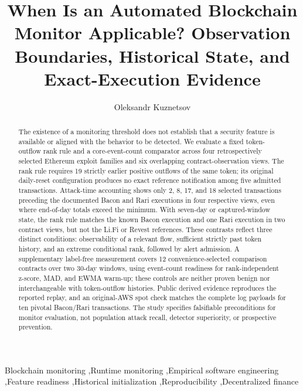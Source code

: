 \documentclass[preprint,12pt,authoryear]{elsarticle}
\begin{document}
\begin{frontmatter}
\title{When Is an Automated Blockchain Monitor Applicable? Observation Boundaries, Historical State, and Exact-Execution Evidence}
\author[aff1,aff2]{Oleksandr Kuznetsov}
\address[aff1]{Department of Theoretical and Applied Sciences, eCampus University, Italy}
\address[aff2]{Department of Intelligent Software Systems and Technologies, School of Computer Science and Artificial Intelligence, V.~N. Karazin Kharkiv National University, Ukraine}
\begin{abstract}
The existence of a monitoring threshold does not establish that a security feature is available or aligned with the behavior to be detected. We evaluate a fixed token-outflow rank rule and a core-event-count comparator across four retrospectively selected Ethereum exploit families and six overlapping contract-observation views. The rank rule requires 19 strictly earlier positive outflows of the same token; its original daily-reset configuration produces no exact reference notification among five admitted transactions. Attack-time accounting shows only 2, 8, 17, and 18 selected transactions preceding the documented Bacon and Rari executions in four respective views, even where end-of-day totals exceed the minimum. With seven-day or captured-window state, the rank rule matches the known Bacon execution and one Rari execution in two contract views, but not the Li.Fi or Revest references. These contrasts reflect three distinct conditions: observability of a relevant flow, sufficient strictly past token history, and an extreme conditional rank, followed by alert admission. A supplementary label-free measurement covers 12 convenience-selected comparison contracts over two 30-day windows, using event-count readiness for rank-independent z-score, MAD, and EWMA warm-up; these controls are neither proven benign nor interchangeable with token-outflow histories. Public derived evidence reproduces the reported replay, and an original-AWS spot check matches the complete log payloads for ten pivotal Bacon/Rari transactions. The study specifies falsifiable preconditions for monitor evaluation, not population attack recall, detector superiority, or prospective prevention.
\end{abstract}
\begin{keyword}
Blockchain monitoring \sep Runtime monitoring \sep Empirical software engineering \sep Feature readiness \sep Historical initialization \sep Reproducibility \sep Decentralized finance
\end{keyword}
\end{frontmatter}
\end{document}
